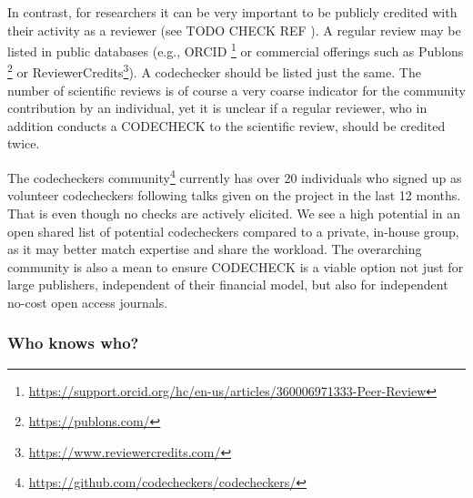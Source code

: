 \documentclass[12pt]{article}
\begin{document}
In contrast, for researchers it can be very important to be publicly credited
with their activity as a reviewer (see TODO CHECK REF ). A regular
review may be listed in public databases (e.g., ORCID
\footnote{\href{https://support.orcid.org/hc/en-us/articles/360006971333-Peer-Review}{https://support.orcid.org/hc/en-us/articles/360006971333-Peer-Review}} or commercial offerings such as Publons
\footnote{\href{https://publons.com/}{https://publons.com/}} or 
ReviewerCredits\footnote{\href{https://www.reviewercredits.com/}{https://www.reviewercredits.com/}}).
A codechecker should be listed just the same. The number of scientific reviews
is of course a very coarse indicator for the community contribution by an 
individual, yet it is unclear if a regular reviewer, who in addition
conducts a CODECHECK to the scientific review, should be credited twice.

The codecheckers community\footnote{\href{https://github.com/codecheckers/codecheckers/}{https://github.com/codecheckers/codecheckers/}}
currently has over 20 individuals who signed up as volunteer codecheckers
following talks given on the project in the last 12 months.
That is even though no checks are actively elicited.
We see a high potential in an open shared list of potential codecheckers 
compared to a private, in-house group, as it may better match expertise
and share the workload.
The overarching community is also a mean to ensure CODECHECK is a viable
option not just for large publishers, independent of their financial model,
but also for independent no-cost open access journals.

\subsubsection*{Who knows who?}\label{who-knows-who}
\end{document}
